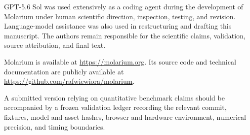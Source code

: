 \documentclass[11pt]{article}
\begin{document}
GPT-5.6 Sol was used extensively as a coding agent during the development of Molarium under human scientific direction, inspection, testing, and revision. Language-model assistance was also used in restructuring and drafting this manuscript. The authors remain responsible for the scientific claims, validation, source attribution, and final text.

Molarium is available at \url{https://molarium.org}. Its source code and technical documentation are publicly available at \url{https://github.com/rafwiewiora/molarium}.

\noindent\colorbox{yellow!25}{\parbox{\dimexpr\linewidth-2\fboxsep\relax}{A submitted version relying on quantitative benchmark claims should be accompanied by a frozen validation ledger recording the relevant commit, fixtures, model and asset hashes, browser and hardware environment, numerical precision, and timing boundaries.}}
\end{document}
